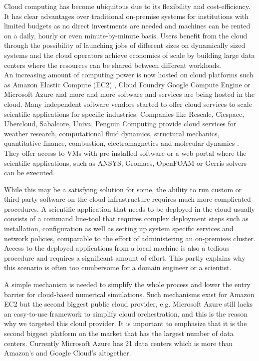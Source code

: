\documentclass[3p,times]{elsarticle}
\begin{document}
Cloud computing has become ubiquitous due to its flexibility and cost-efficiency. It has clear advantages over traditional on-premise systems for institutions with limited budgets as no direct investments are needed and machines can be rented on a daily, hourly or even minute-by-minute basis. Users benefit from the cloud through the possibility of launching jobs of different sizes on dynamically sized systems and the cloud operators achieve economies of scale by building large data centers where the resources can be shared between different workloads. \\
An increasing amount of computing power is now hosted on cloud platforms such as Amazon Elastic Compute (EC2) \cite{ec2}, Cloud Foundry Google Compute Engine \cite{google} or Microsoft Azure \cite{azure} and more and more software and services are being hosted in the cloud. Many independent software vendors started to offer cloud services to scale scientific applications for specific industries. Companies like Rescale, Ciespace, Ubercloud, Sabalcore, Univa, Penguin Computing provide cloud services for weather research, computational fluid dynamics, structural mechanics, quantitative finance, combustion, electromagnetics and molecular dynamics \cite{theuebercloud}. They offer access to VMs with pre-installed software or a web portal where the scientific applications, such as ANSYS, Gromacs, OpenFOAM or Gerris solvers \cite{Popinet2003} can be executed.

While this may be a satisfying solution for some, the ability to run custom or third-party software on the cloud infrastructure requires much more complicated procedures. A scientific application that needs to be deployed in the cloud usually consists of a command line-tool that requires complex deployment steps such as installation, configuration as well as setting up system specific services and network policies, comparable to the effort of administering an on-premises cluster. Access to the deployed applications from a local machine is also a tedious procedure and requires a significant amount of effort. This partly explains why this scenario is often too cumbersome for a domain engineer or a scientist.  

A simple mechanism is needed to simplify the whole process and lower the entry barrier for cloud-based numerical simulations. Such mechanisms exist for Amazon EC2 \cite{ec2} \cite{eucalyptus} but the second biggest public cloud provider, e.g. Microsoft Azure still lacks an easy-to-use framework to simplify cloud orchestration, and this is the reason why we targeted this cloud provider. It is important to emphasize that it is the second biggest platform on the market \cite{Garg2013} that has the largest number of data centers. Currently Microsoft Azure has 21 data centers which is more than Amazon's and Google Cloud's altogether.
\end{document}
